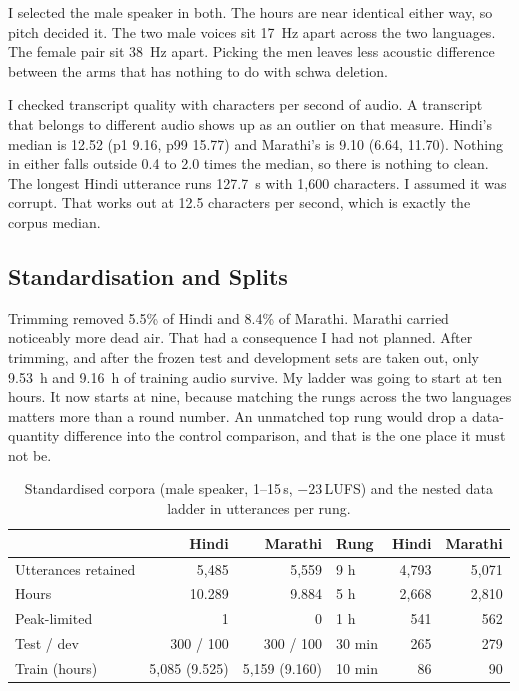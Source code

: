 \documentclass[12pt,a4paper]{article}
\begin{document}
I selected the male speaker in both. The hours are near identical either way, so pitch
decided it. The two male voices sit 17~Hz apart across the two languages. The
female pair sit 38~Hz apart. Picking the men leaves less acoustic difference
between the arms that has nothing to do with schwa deletion.

I checked transcript quality with characters per second of audio. A transcript
that belongs to different audio shows up as an outlier on that measure. Hindi's
median is 12.52 (p1 9.16, p99 15.77) and Marathi's is 9.10 (6.64, 11.70).
Nothing in either falls outside 0.4 to 2.0 times the median, so there is
nothing to clean. The longest Hindi utterance runs 127.7~s with 1{,}600
characters. I assumed it was corrupt. That works out at 12.5 characters per
second, which is exactly the corpus median.

\subsection{Standardisation and Splits}

Trimming removed 5.5\% of Hindi and 8.4\% of Marathi. Marathi carried
noticeably more dead air. That had a consequence I had not planned. After
trimming, and after the frozen test and development sets are taken out, only
9.53~h and 9.16~h of training audio survive. My ladder was going to start at
ten hours. It now starts at nine, because matching the rungs across the two
languages matters more than a round number. An unmatched top rung would drop a
data-quantity difference into the control comparison, and that is the one place
it must not be.

\begin{table}[htbp]
\centering\small
\caption{Standardised corpora (male speaker, 1--15\,s, $-23$\,LUFS) and the
nested data ladder in utterances per rung.}
\label{tab:prepared}
\begin{tabular}{lrr@{\hskip 20pt}lrr}
\toprule
& Hindi & Marathi & Rung & Hindi & Marathi \\
\midrule
Utterances retained & 5{,}485 & 5{,}559 & 9 h     & 4{,}793 & 5{,}071 \\
Hours               & 10.289 & 9.884   & 5 h     & 2{,}668 & 2{,}810 \\
Peak-limited        & 1 & 0             & 1 h     & 541 & 562 \\
Test / dev          & 300 / 100 & 300 / 100 & 30 min & 265 & 279 \\
Train (hours)       & 5{,}085 (9.525) & 5{,}159 (9.160) & 10 min & 86 & 90 \\
\bottomrule
\end{tabular}
\end{table}
\end{document}
